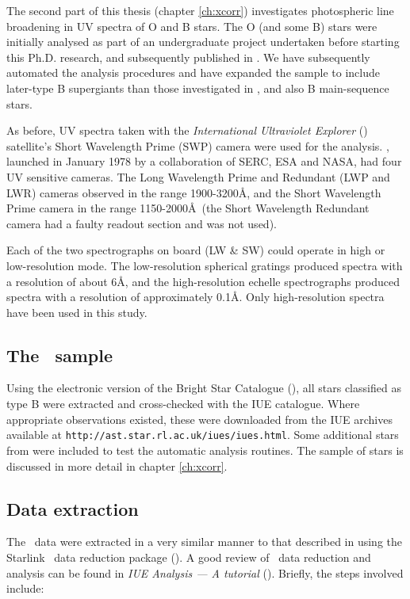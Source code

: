 The second part of this thesis (chapter \ref{ch:xcorr}) investigates
photospheric line broadening in UV spectra of O and B stars. The O
(and some B) stars were initially analysed as part of an undergraduate project
undertaken before starting this Ph.D. research, and subsequently
published in . We have subsequently automated the analysis
procedures and have expanded the sample to include later-type B
supergiants than those investigated in , and also B
main-sequence stars. 

As before, UV spectra taken with the
\emph{International Ultraviolet Explorer} (\iue)
satellite's Short Wavelength Prime (SWP) camera were used for the
analysis. \iue, launched in January 1978 by a collaboration of SERC,
ESA and NASA, had four UV sensitive cameras. The Long Wavelength Prime
and Redundant (LWP and LWR) cameras observed in the range
1900-3200\AA, and the Short Wavelength Prime camera in the range
1150-2000\AA\ (the Short Wavelength Redundant camera had a faulty
readout section and was not used). 

Each of the two spectrographs on board (LW \& SW) could operate in
high or low-resolution mode. The low-resolution spherical gratings
produced spectra with a resolution of about 6\AA, and the
high-resolution echelle spectrographs produced spectra with a
resolution of approximately 0.1\AA. Only high-resolution spectra have
been used in this study.

\subsection{The \iue\ sample}

Using the electronic version of the Bright Star Catalogue
(\cite{bsc5}), all stars classified as type B were extracted and
cross-checked with the IUE catalogue. Where appropriate observations
existed, these were downloaded from the IUE archives available at
\texttt{http://ast.star.rl.ac.uk/iues/iues.html}. Some additional stars from
 were included to test the automatic analysis
routines. The sample of stars is discussed in more detail in chapter
\ref{ch:xcorr}.

\subsection{Data extraction}

The \iue\ data were extracted in a very similar manner to that
described in  using the Starlink \iue\ data reduction
package  (\cite{iuedr}). A good review of \iue\ data
reduction and analysis can be found in \emph{IUE Analysis --- A
tutorial} (\cite{sg:7}). Briefly, the steps involved include:

